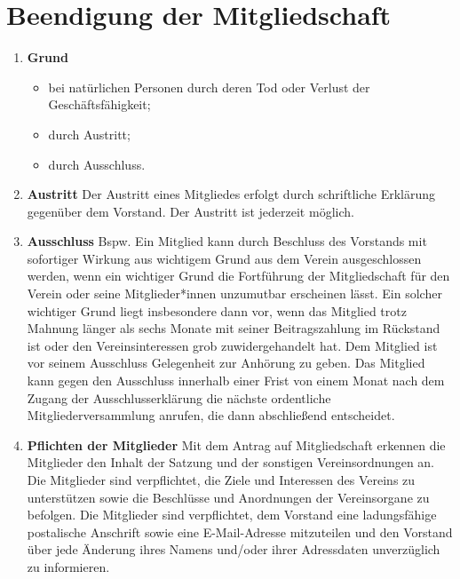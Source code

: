 \documentclass{scrartcl}
\begin{document}
    \section{Beendigung der Mitgliedschaft}
        \begin{enumerate}
            \item \textbf{Grund}
                \begin{itemize}
                    \item bei natürlichen Personen durch deren Tod oder Verlust der Geschäftsfähigkeit;
                    \item durch Austritt;
                    \item durch Ausschluss.
                \end{itemize}
            \item \textbf{Austritt} \newline
                Der Austritt eines Mitgliedes erfolgt durch schriftliche Erklärung gegenüber dem
                Vorstand. Der Austritt ist jederzeit möglich.
            \item \textbf{Ausschluss} \newline
                Bspw. Ein Mitglied kann durch Beschluss des Vorstands mit sofortiger Wirkung aus
                wichtigem Grund aus dem Verein ausgeschlossen werden, wenn ein wichtiger Grund die
                Fortführung der Mitgliedschaft für den Verein oder seine Mitglieder*innen unzumutbar
                erscheinen lässt.
                Ein solcher wichtiger Grund liegt insbesondere dann vor, wenn das Mitglied trotz Mahnung
                länger als sechs Monate mit seiner Beitragszahlung im Rückstand ist oder den
                Vereinsinteressen grob zuwidergehandelt hat.
                Dem Mitglied ist vor seinem Ausschluss Gelegenheit zur Anhörung zu geben.
                Das Mitglied kann gegen den Ausschluss innerhalb einer Frist von einem Monat nach dem
                Zugang der Ausschlusserklärung die nächste ordentliche Mitgliederversammlung anrufen,
                die dann abschließend entscheidet.
            \item \textbf{Pflichten der Mitglieder} \newline
                Mit dem Antrag auf Mitgliedschaft erkennen die Mitglieder den Inhalt der Satzung und der
                sonstigen Vereinsordnungen an. Die Mitglieder sind verpflichtet, die Ziele und Interessen des
                Vereins zu unterstützen sowie die Beschlüsse und Anordnungen der Vereinsorgane zu
                befolgen.
                Die Mitglieder sind verpflichtet, dem Vorstand eine ladungsfähige postalische Anschrift sowie
                eine E-Mail-Adresse mitzuteilen und den Vorstand über jede Änderung ihres Namens und/oder
                ihrer Adressdaten unverzüglich zu informieren.
        \end{enumerate}
\end{document}
